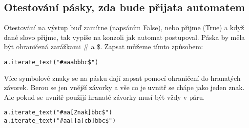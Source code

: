 \documentclass{article}
\begin{document}
\subsection{Otestování pásky, zda bude přijata automatem}
Otestování na výstup buď zamítne (napsáním False), nebo přijme (True) a když dané slovo přijme,
tak vypíše na konzoli jak automat postupoval.
Páska by měla být ohraničená zarážkami \# a \$.
Zapsat můžeme tímto způsobem:
\begin{lstlisting}
a.iterate_text("#aaabbbc$")
\end{lstlisting}
Více symbolové znaky se na pásku dají zapsat pomocí ohraničení do hranatých závorek.
Berou se jen vnější závorky a vše co je uvnitř se chápe jako jeden znak.
Ale pokud se uvnitř použijí hranaté závorky musí být vždy v páru.
\begin{lstlisting}
a.iterate_text("#aa[Znak]bbc$")
a.iterate_text("#aa[[a]cb]bbc$")
\end{lstlisting}
\end{document}
